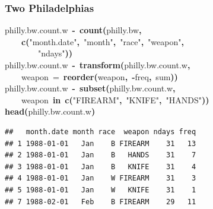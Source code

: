 \documentclass[]{beamer}
\makeatletter
\newcommand{\hlfunctioncall}[1]{\textcolor[rgb]{.5,0,.33}{\textbf{#1}}}%
\newcommand{\hlstring}[1]{\textcolor[rgb]{.6,.6,1}{#1}}%
\newcommand{\hlkeyword}[1]{\textbf{#1}}%
\newcommand{\hlargument}[1]{\textcolor[rgb]{.69,.25,.02}{#1}}%
\newcommand{\hlassignement}[1]{\textbf{#1}}%
\newcommand{\hlsymbol}[1]{#1}%
\newcommand{\hlstd}[1]{\textcolor[rgb]{0,0,0}{#1}}%
\newenvironment{kframe}{%
 \def\FrameCommand##1{\hskip\@totalleftmargin \hskip-\fboxsep
 \colorbox{shadecolor}{##1}\hskip-\fboxsep
     \hskip-\linewidth \hskip-\@totalleftmargin \hskip\columnwidth}%
 \MakeFramed {\advance\hsize-\width
   \@totalleftmargin\z@ \linewidth\hsize
   \@setminipage}}%
 {\par\unskip\endMakeFramed}
\newenvironment{knitrout}{}{} %
\renewenvironment{knitrout}{\begin{footnotesize}}{\end{footnotesize}}
\makeatother
\begin{document}
\begin{frame}[fragile]
\frametitle{Two Philadelphias}
\begin{knitrout}
\color{fgcolor}\begin{kframe}
\begin{flushleft}
\ttfamily\noindent
\hlsymbol{philly.bw.count.w}{\ }\hlassignement{\usebox{\hlnormalsizeboxlessthan}-}{\ }\hlfunctioncall{count}\hlkeyword{(}\hlsymbol{philly.bw}\hlkeyword{,}\hspace*{\fill}\\
\hlstd{}{\ }{\ }{\ }{\ }\hlfunctioncall{c}\hlkeyword{(}\hlstring{"{}month.date"{}}\hlkeyword{,}{\ }\hlstring{"{}month"{}}\hlkeyword{,}{\ }\hlstring{"{}race"{}}\hlkeyword{,}{\ }\hlstring{"{}weapon"{}}\hlkeyword{,}\hspace*{\fill}\\
\hlstd{}{\ }{\ }{\ }{\ }{\ }{\ }{\ }{\ }\hlstring{"{}ndays"{}}\hlkeyword{)}\hlkeyword{)}\hspace*{\fill}\\
\hlstd{}\hlsymbol{philly.bw.count.w}{\ }\hlassignement{\usebox{\hlnormalsizeboxlessthan}-}{\ }\hlfunctioncall{transform}\hlkeyword{(}\hlsymbol{philly.bw.count.w}\hlkeyword{,}\hspace*{\fill}\\
\hlstd{}{\ }{\ }{\ }{\ }\hlargument{weapon}{\ }\hlargument{=}{\ }\hlfunctioncall{reorder}\hlkeyword{(}\hlsymbol{weapon}\hlkeyword{,}{\ }\hlkeyword{-}\hlsymbol{freq}\hlkeyword{,}{\ }\hlsymbol{sum}\hlkeyword{)}\hlkeyword{)}\hspace*{\fill}\\
\hlstd{}\hlsymbol{philly.bw.count.w}{\ }\hlassignement{\usebox{\hlnormalsizeboxlessthan}-}{\ }\hlfunctioncall{subset}\hlkeyword{(}\hlsymbol{philly.bw.count.w}\hlkeyword{,}\hspace*{\fill}\\
\hlstd{}{\ }{\ }{\ }{\ }\hlsymbol{weapon}{\ }\hlkeyword{\usebox{\hlnormalsizeboxpercent}in\usebox{\hlnormalsizeboxpercent}}{\ }\hlfunctioncall{c}\hlkeyword{(}\hlstring{"{}FIREARM"{}}\hlkeyword{,}{\ }\hlstring{"{}KNIFE"{}}\hlkeyword{,}{\ }\hlstring{"{}HANDS"{}}\hlkeyword{)}\hlkeyword{)}\hspace*{\fill}\\
\hlstd{}\hlfunctioncall{head}\hlkeyword{(}\hlsymbol{philly.bw.count.w}\hlkeyword{)}\mbox{}
\normalfont
\end{flushleft}
\begin{verbatim}
##   month.date month race  weapon ndays freq
## 1 1988-01-01   Jan    B FIREARM    31   13
## 2 1988-01-01   Jan    B   HANDS    31    7
## 3 1988-01-01   Jan    B   KNIFE    31    4
## 4 1988-01-01   Jan    W FIREARM    31    3
## 5 1988-01-01   Jan    W   KNIFE    31    1
## 7 1988-02-01   Feb    B FIREARM    29   11
\end{verbatim}
\end{kframe}
\end{knitrout}

\end{frame}
\end{document}
